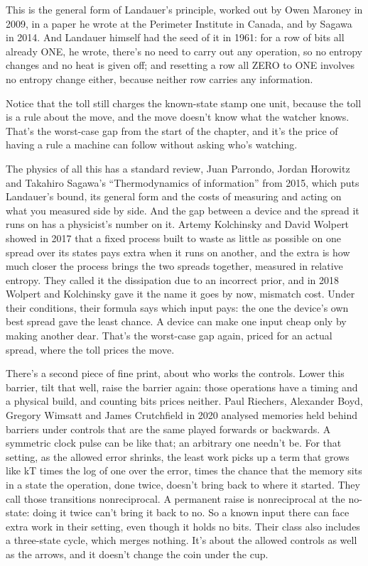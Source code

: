 \documentclass[11pt,twoside]{article}
\theoremstyle{thielethm}
\theoremstyle{thieledef}
\theoremstyle{thieledef}
\theoremstyle{thieledef}
\theoremstyle{thielethm}
\theoremstyle{thieleobs}
\theoremstyle{thielethm}
\begin{document}
This is the general form of Landauer's principle, worked out by Owen Maroney in 2009, in a paper he wrote at the Perimeter Institute in Canada, and by Sagawa in 2014. And Landauer himself had the seed of it in 1961: for a row of bits all already ONE, he wrote, there's no need to carry out any operation, so no entropy changes and no heat is given off; and resetting a row all ZERO to ONE involves no entropy change either, because neither row carries any information.

Notice that the toll still charges the known-state stamp one unit, because the toll is a rule about the move, and the move doesn't know what the watcher knows. That's the worst-case gap from the start of the chapter, and it's the price of having a rule a machine can follow without asking who's watching.

The physics of all this has a standard review, Juan Parrondo, Jordan Horowitz and Takahiro Sagawa's ``Thermodynamics of information'' from 2015, which puts Landauer's bound, its general form and the costs of measuring and acting on what you measured side by side. And the gap between a device and the spread it runs on has a physicist's number on it. Artemy Kolchinsky and David Wolpert showed in 2017 that a fixed process built to waste as little as possible on one spread over its states pays extra when it runs on another, and the extra is how much closer the process brings the two spreads together, measured in relative entropy. They called it the dissipation due to an incorrect prior, and in 2018 Wolpert and Kolchinsky gave it the name it goes by now, mismatch cost. Under their conditions, their formula says which input pays: the one the device's own best spread gave the least chance. A device can make one input cheap only by making another dear. That's the worst-case gap again, priced for an actual spread, where the toll prices the move.

There's a second piece of fine print, about who works the controls. Lower this barrier, tilt that well, raise the barrier again: those operations have a timing and a physical build, and counting bits prices neither. Paul Riechers, Alexander Boyd, Gregory Wimsatt and James Crutchfield in 2020 analysed memories held behind barriers under controls that are the same played forwards or backwards. A symmetric clock pulse can be like that; an arbitrary one needn't be. For that setting, as the allowed error shrinks, the least work picks up a term that grows like kT times the log of one over the error, times the chance that the memory sits in a state the operation, done twice, doesn't bring back to where it started. They call those transitions nonreciprocal. A permanent raise is nonreciprocal at the no-state: doing it twice can't bring it back to no. So a known input there can face extra work in their setting, even though it holds no bits. Their class also includes a three-state cycle, which merges nothing. It's about the allowed controls as well as the arrows, and it doesn't change the coin under the cup.
\end{document}
